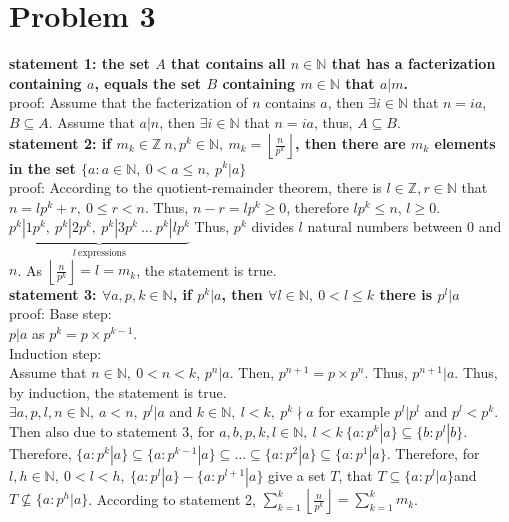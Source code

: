 \documentclass{article}
\begin{document}
\section*{Problem 3}
\textbf{statement 1: the set \(A\) that contains all $n\in\mathbb{N}$ that has a facterization containing $a$, equals the set \(B\) containing \(m\in\mathbb{N}\) that $a|m$.}\\
proof: Assume that the facterization of $n$ contains $a$, then $\exists i\in \mathbb{N}$ that $n=ia$, \(B\subseteq A\).
Assume that $a|n$, then $\exists i\in \mathbb{N}$ that $n=ia$, thus, \(A\subseteq B\).\\
\textbf{statement 2: if \(m_k\in \mathbb{Z}\ n,p^k\in \mathbb{N},\ m_k=\displaystyle{\left\lfloor \frac{n}{p^k}\right\rfloor}\), then there are \(m_k\) elements in the set \(\{a:a\in \mathbb{N},\ 0<a\leqslant n,\ p^k|a\}\)}\\
proof: According to the quotient-remainder theorem, there is \(l\in\mathbb{Z}, r\in \mathbb{N}\) that \(n=lp^k+r,\ 0\leqslant r<n\). 
Thus, \(n-r=lp^k\geqslant0\), therefore \(lp^k\leqslant n\), \(l\geqslant 0\). \(\underbrace{p^k|1 p^k,\ p^k|2 p^k,\ p^k|3 p^k\ \dots\ p^k|l p^k }_{l \ \text{expressions}}\)
Thus, \(p^k\) divides \(l\)  natural numbers between 0 and \(n\). As \(\displaystyle{\left\lfloor \frac{n}{p^k}\right\rfloor}=l=m_k\), the statement is true.\\
\textbf{statement 3: \(\forall a, p,k\in \mathbb{N}\), if \(p^k|a\), then \(\forall l\in \mathbb{N},\ 0<l\leqslant k\) there is \(p^l|a\)}\\
proof: Base step:\\
\(p|a\) as \(p^k=p\times p^{k-1}\).\\
Induction step:\\
Assume that \(n\in\mathbb{N},\ 0<n< k\), \(p^n|a\). Then, \(p^{n+1}=p\times p^n\). Thus, \(p^{n+1}|a\).
Thus, by induction, the statement is true.\\ \newline
\(\exists a,p,l,n\in \mathbb{N},\ a<n, \  p^l|a\) and \(k\in\mathbb{N},\ l<k,\ p^k\nmid a\) for example \(p^l|p^l\) and \(p^l<p^k\). Then also due to statement 3, for
\(a,b,p,k,l\in\mathbb{N},\ l<k\ \{a:p^k|a\}\subseteq\{b:p^l|b\} \). Therefore, \(\{a:p^k|a\}\subseteq\{a:p^{k-1}|a\}\subseteq\dots\subseteq\{a:p^2|a\}\subseteq\{a:p^1|a\}\).
Therefore, for \(l,h\in \mathbb{N},\ 0<l<h,\ \{a:p^l|a\}-\{a:p^{l+1}|a\}\) give a set \(T\), that \(T\subseteq\{a:p^l|a\}\)and \(T\nsubseteq\{a:p^h|a\}\). 
According to statement 2, \(\displaystyle{\sum^k_{k=1}\left\lfloor \frac{n}{p^k}\right\rfloor=\sum^k_{k=1}m_k}\).
\end{document}
